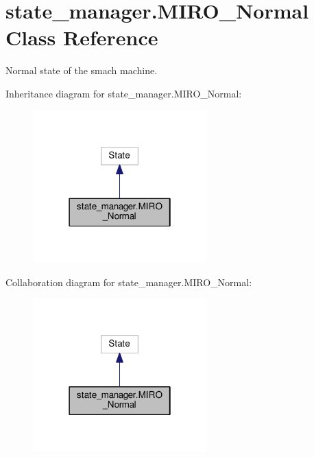 \hypertarget{classstate__manager_1_1MIRO__Normal}{}\section{state\+\_\+manager.\+M\+I\+R\+O\+\_\+\+Normal Class Reference}
\label{classstate__manager_1_1MIRO__Normal}


Normal state of the smach machine.  




Inheritance diagram for state\+\_\+manager.\+M\+I\+R\+O\+\_\+\+Normal\+:
\nopagebreak
\begin{figure}[H]
\begin{center}
\leavevmode
\includegraphics[width=190pt]{classstate__manager_1_1MIRO__Normal__inherit__graph}
\end{center}
\end{figure}


Collaboration diagram for state\+\_\+manager.\+M\+I\+R\+O\+\_\+\+Normal\+:
\nopagebreak
\begin{figure}[H]
\begin{center}
\leavevmode
\includegraphics[width=190pt]{classstate__manager_1_1MIRO__Normal__coll__graph}
\end{center}
\end{figure}
